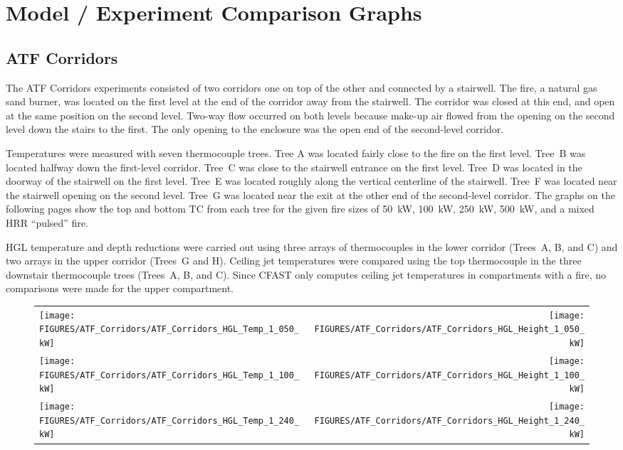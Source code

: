 \chapter{Model / Experiment Comparison Graphs}
\label{sec:Graphs}

\section{ATF Corridors}

The ATF Corridors experiments consisted of two corridors one on top of the other and connected by a stairwell. The fire, a natural gas sand burner, was located on the first level at the end of the corridor away from the stairwell. The corridor was closed at this end, and open at the same position on the second level. Two-way flow occurred on both levels because make-up air flowed from the opening on the second level down the stairs to the first. The only opening to the enclosure was the open end of the second-level corridor.

Temperatures were measured with seven thermocouple trees. Tree A was located fairly close to the fire on the first level. Tree~B was located halfway down the first-level corridor. Tree~C was close to the stairwell entrance on the first level. Tree~D was located in the doorway of the stairwell on the first level. Tree~E was located roughly along the vertical centerline of the
stairwell. Tree~F was located near the stairwell opening on the second level. Tree~G was located near the exit at the other end of the second-level corridor. The graphs on the following pages show the top and bottom TC from each tree for the given fire sizes of 50~kW, 100~kW, 250~kW, 500~kW, and a mixed HRR ``pulsed'' fire. 

HGL temperature and depth reductions were carried out using three arrays of thermocouples in the lower corridor (Trees~A, B, and C) and two arrays in the upper corridor (Trees~G and H). 
Ceiling jet temperatures were compared using the top thermocouple in the three downstair thermocouple trees (Trees~A, B, and C). Since CFAST only computes ceiling jet temperatures in compartments with a fire, no comparisons were made for the upper compartment.

\begin{figure}
\begin{tabular*}{\textwidth}{l@{\extracolsep{\fill}}r}
\texttt{[image: FIGURES/ATF\_Corridors/ATF\_Corridors\_HGL\_Temp\_1\_050\_kW]} &
\texttt{[image: FIGURES/ATF\_Corridors/ATF\_Corridors\_HGL\_Height\_1\_050\_kW]} \\
\texttt{[image: FIGURES/ATF\_Corridors/ATF\_Corridors\_HGL\_Temp\_1\_100\_kW]} &
\texttt{[image: FIGURES/ATF\_Corridors/ATF\_Corridors\_HGL\_Height\_1\_100\_kW]} \\
\texttt{[image: FIGURES/ATF\_Corridors/ATF\_Corridors\_HGL\_Temp\_1\_240\_kW]} &
\texttt{[image: FIGURES/ATF\_Corridors/ATF\_Corridors\_HGL\_Height\_1\_240\_kW]}
\end{tabular*}
\end{figure}

